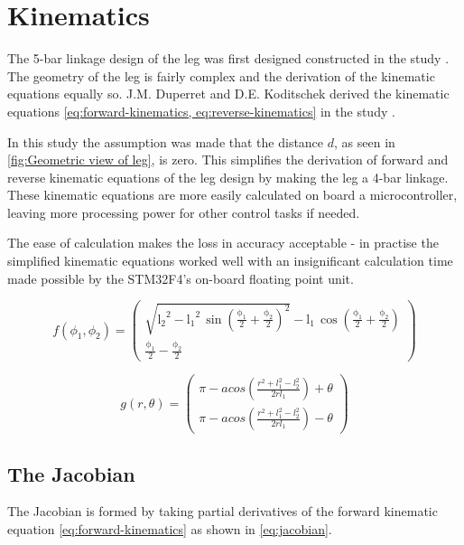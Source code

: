 \chapter{Kinematics}
\label{chap:kinematics}

The 5-bar linkage design of the leg was first designed constructed in the study \cite{Duperret}. The geometry of the leg is fairly complex and the derivation of the kinematic equations equally so. J.M. Duperret and D.E. Koditschek derived the kinematic equations \cref{eq:forward-kinematics, eq:reverse-kinematics} in the study \cite{Duperret}. 

In this study the assumption was made that the distance $d$, as seen in \cref{fig:Geometric view of leg}, is zero. This simplifies the derivation of forward and reverse kinematic equations of the leg design by making the leg a 4-bar linkage. These kinematic equations are more easily calculated on board a microcontroller\cite{Duperret}, leaving more processing power for other control tasks if needed. 

The ease of calculation makes the loss in accuracy acceptable - in practise the simplified kinematic equations worked well with an insignificant calculation time made possible by the STM32F4's on-board floating point unit.

\begin{equation} \label{eq:forward-kinematics}
f(\phi_1, \phi_2) = \left(\begin{array}{c} \sqrt{{\mathrm{l_2}}^2 - {\mathrm{l_1}}^2\, {\sin\!\left(\frac{\mathrm{\phi_1}}{2} + \frac{\mathrm{\phi_2}}{2}\right)}^2} - \mathrm{l_1}\, \cos\!\left(\frac{\mathrm{\phi_1}}{2} + \frac{\mathrm{\phi_2}}{2}\right)\\
\frac{\mathrm{\phi_1}}{2} - \frac{\mathrm{\phi_2}}{2} \end{array}\right)
\end{equation}

\begin{equation} \label{eq:reverse-kinematics}
g(r, \theta) = \left(\begin{array}{c} \pi - acos(\frac{r^2 + l_1^2 - l_2^2}{2rl_1}) + \theta \\
\pi - acos(\frac{r^2 + l_1^2 - l_2^2}{2rl_1}) - \theta  \end{array}\right)
\end{equation}

\section{The Jacobian}
The Jacobian is formed by taking partial derivatives of the forward kinematic equation \cref{eq:forward-kinematics} as shown in \cref{eq:jacobian}. 

